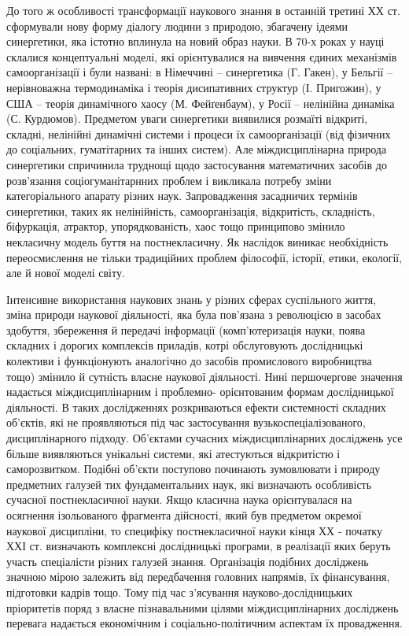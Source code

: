 До того ж особливості трансформації наукового знання в останній третині
ХХ ст. сформували нову форму діалогу людини з природою, збагачену ідеями
синергетики, яка істотно вплинула на новий образ науки. В 70-х роках у науці
склалися концептуальні моделі, які орієнтувалися на вивчення єдиних
механізмів самоорганізації і були названі: в Німеччині – синергетика (Г. Гакен),
у Бельгії – нерівноважна термодинаміка і теорія дисипативних структур (І.
Пригожин), у США – теорія динамічного хаосу (М. Фейґенбаум), у Росії –
нелінійна динаміка (С. Курдюмов). Предметом уваги синергетики виявилися
розмаїті відкриті, складні, нелінійні динамічні системи і процеси їх
самоорганізації (від фізичних до соціальних, гуматітарних та інших систем).
Але міждисциплінарна природа синергетики спричинила труднощі щодо
застосування математичних засобів до розв’язання соціогуманітарнних
проблем і викликала потребу зміни категоріального апарату різних наук.
Запровадження засадничих термінів синергетики, таких як нелінійність,
самоорганізація, відкритість, складність, біфуркація, атрактор, упорядкованість,
хаос тощо принципово змінило некласичну модель буття на постнекласичну.
Як наслідок виникає необхідність переосмислення не тільки традиційних
проблем філософії, історії, етики, екології, але й нової моделі світу.

Інтенсивне використання наукових знань у різних сферах суспільного
життя, зміна природи наукової діяльності, яка була пов’язана з революцією в
засобах здобуття, збереження й передачі інформації (комп’ютеризація науки,
поява складних і дорогих комплексів приладів, котрі обслуговують
дослідницькі колективи і функціонують аналогічно до засобів промислового
виробництва тощо) змінило й сутність власне наукової діяльності. Нині
першочергове значення надається міждисциплінарним і проблемно-
орієнтованим формам дослідницької діяльності. В таких дослідженнях
розкриваються ефекти системності складних об’єктів, які не проявляються під
час застосування вузькоспеціалізованого, дисциплінарного підходу. Об’єктами
сучасних міждисциплінарних досліджень усе більше виявляються унікальні
системи, які атестуються відкритістю і саморозвитком. Подібні об’єкти
поступово починають зумовлювати і природу предметних галузей тих
фундаментальних наук, які визначають особливість сучасної постнекласичної
науки. Якщо класична наука орієнтувалася на осягнення ізольованого
фрагмента дійсності, який був предметом окремої наукової дисципліни, то
специфіку постнекласичної науки кінця ХХ - початку ХХІ ст. визначають
комплексні дослідницькі програми, в реалізації яких беруть участь спеціалісти
різних галузей знання. Організація подібних досліджень значною мірою
залежить від передбачення головних напрямів, їх фінансування, підготовки
кадрів тощо. Тому під час з’ясування науково-дослідницьких пріоритетів поряд
з власне пізнавальними цілями міждисциплінарних досліджень перевага
надається економічним і соціально-політичним аспектам їх провадження.

